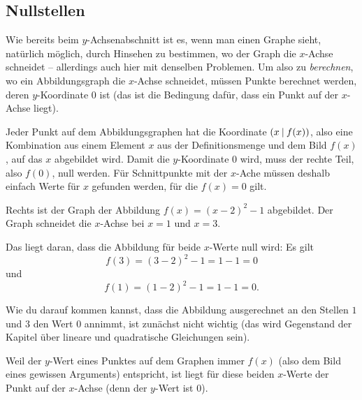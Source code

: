\documentclass[../../main.tex]{subfiles}
\begin{document}
\fussy

\subsection{Nullstellen}
\label{sec:abbildungen_nullstelle}

Wie bereits beim $y$-Achsenabschnitt ist es, wenn man einen Graphe sieht, natürlich möglich, durch Hinsehen zu bestimmen, wo der Graph die $x$-Achse schneidet -- allerdings auch hier mit denselben Problemen. Um also zu \emph{berechnen}, wo ein Abbildungsgraph die $x$-Achse schneidet, müssen Punkte berechnet werden, deren $y$-Koordinate $0$ ist (das ist die Bedingung dafür, dass ein Punkt auf der $x$-Achse liegt).

Jeder Punkt auf dem Abbildungsgraphen hat die Koordinate $\left(x \:\middle|\: f(x)\right)$, also eine Kombination aus einem Element $x$ aus der Definitionsmenge und dem Bild $f(x)$, auf das $x$ abgebildet wird. Damit die $y$-Koordinate $0$ wird, muss der rechte Teil, also $f(0)$, null werden. Für Schnittpunkte mit der $x$-Ache müssen deshalb einfach Werte für $x$ gefunden werden, für die $f(x)=0$ gilt.

\begin{example}
    Rechts ist der Graph der Abbildung $f(x)=(x-2)^2-1$ abgebildet. Der Graph schneidet die $x$-Achse bei $x=1$ und $x=3$. 
    
    Das liegt daran, dass die Abbildung für beide $x$-Werte null wird: Es gilt \[f(3)=(3-2)^2-1=1-1=0\] und \[f(1)=(1-2)^2-1=1-1=0.\]
    
    Wie du darauf kommen kannst, dass die Abbildung ausgerechnet an den Stellen $1$ und $3$ den Wert $0$ annimmt, ist zunächst nicht wichtig (das wird Gegenstand der Kapitel über lineare und quadratische Gleichungen sein).
    
    Weil der $y$-Wert eines Punktes auf dem Graphen immer $f(x)$ (also dem Bild eines gewissen Arguments) entspricht, ist liegt für diese beiden $x$-Werte der Punkt auf der $x$-Achse (denn der $y$-Wert ist $0$).
\end{example}
\end{document}
